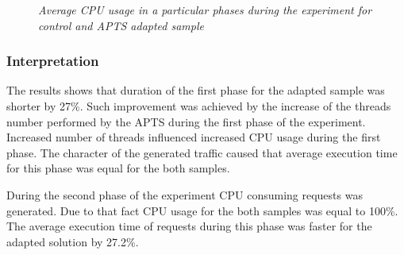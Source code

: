 \documentclass[10pt,a4paper]{article}
\begin{document}
\mydata
\begin{figure}[!htb]
\centering
{}
\caption{\textit{Average CPU usage in a particular phases during the experiment for control and APTS adapted sample}} \label{figure:threads:results:cpu}
\end{figure}


\subsubsection{Interpretation} 

The results shows that duration of the first phase for the adapted sample was shorter by 27\%. Such improvement was achieved by the increase of the threads number performed by the APTS during the first phase of the experiment. Increased number of threads influenced increased CPU usage during the first phase. The character of the generated traffic caused that average execution time for this phase was equal for the both samples. 

During the second phase of the experiment CPU consuming requests was generated. Due to that fact CPU usage for the both samples was equal to 100\%. The average execution time of requests during this phase was faster for the adapted solution by 27.2\%. 
\end{document}
